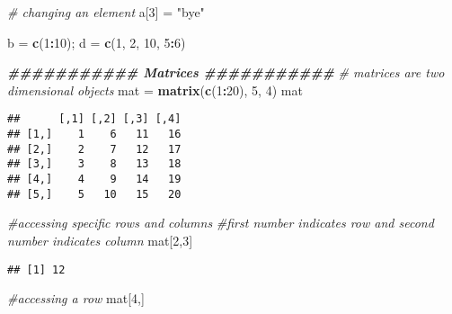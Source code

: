 \documentclass[
]{article}
\newenvironment{Shaded}{\begin{snugshade}}{\end{snugshade}}
\newcommand{\CommentTok}[1]{\textcolor[rgb]{0.56,0.35,0.01}{\textit{#1}}}
\newcommand{\DecValTok}[1]{\textcolor[rgb]{0.00,0.00,0.81}{#1}}
\newcommand{\DocumentationTok}[1]{\textcolor[rgb]{0.56,0.35,0.01}{\textbf{\textit{#1}}}}
\newcommand{\FunctionTok}[1]{\textcolor[rgb]{0.13,0.29,0.53}{\textbf{#1}}}
\newcommand{\NormalTok}[1]{#1}
\newcommand{\OtherTok}[1]{\textcolor[rgb]{0.56,0.35,0.01}{#1}}
\newcommand{\SpecialCharTok}[1]{\textcolor[rgb]{0.81,0.36,0.00}{\textbf{#1}}}
\newcommand{\StringTok}[1]{\textcolor[rgb]{0.31,0.60,0.02}{#1}}
\begin{document}
\begin{Shaded}
\begin{Highlighting}[]
\CommentTok{\# changing an element}
\NormalTok{a[}\DecValTok{3}\NormalTok{] }\OtherTok{=} \StringTok{"bye"}

\NormalTok{b }\OtherTok{=} \FunctionTok{c}\NormalTok{(}\DecValTok{1}\SpecialCharTok{:}\DecValTok{10}\NormalTok{); d }\OtherTok{=} \FunctionTok{c}\NormalTok{(}\DecValTok{1}\NormalTok{, }\DecValTok{2}\NormalTok{, }\DecValTok{10}\NormalTok{, }\DecValTok{5}\SpecialCharTok{:}\DecValTok{6}\NormalTok{)}
\end{Highlighting}
\end{Shaded}

\begin{Shaded}
\begin{Highlighting}[]
\DocumentationTok{\#\#\#\#\#\#\#\#\#\#\# Matrices \#\#\#\#\#\#\#\#\#\#\#}
\CommentTok{\# matrices are two dimensional objects}
\NormalTok{mat }\OtherTok{=} \FunctionTok{matrix}\NormalTok{(}\FunctionTok{c}\NormalTok{(}\DecValTok{1}\SpecialCharTok{:}\DecValTok{20}\NormalTok{), }\DecValTok{5}\NormalTok{, }\DecValTok{4}\NormalTok{)}
\NormalTok{mat}
\end{Highlighting}
\end{Shaded}

\begin{verbatim}
##      [,1] [,2] [,3] [,4]
## [1,]    1    6   11   16
## [2,]    2    7   12   17
## [3,]    3    8   13   18
## [4,]    4    9   14   19
## [5,]    5   10   15   20
\end{verbatim}

\begin{Shaded}
\begin{Highlighting}[]
\CommentTok{\#accessing specific rows and columns}
\CommentTok{\#first number indicates row and second number indicates column }
\NormalTok{mat[}\DecValTok{2}\NormalTok{,}\DecValTok{3}\NormalTok{]}
\end{Highlighting}
\end{Shaded}

\begin{verbatim}
## [1] 12
\end{verbatim}

\begin{Shaded}
\begin{Highlighting}[]
\CommentTok{\#accessing a row}
\NormalTok{mat[}\DecValTok{4}\NormalTok{,]}
\end{Highlighting}
\end{Shaded}
\end{document}
